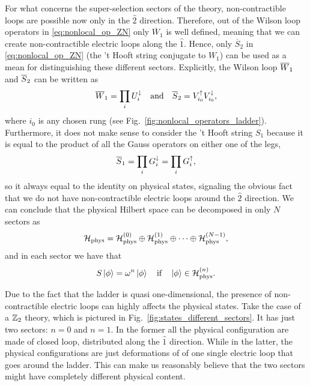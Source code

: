 For what concerns the super-selection sectors of the theory,
non-contractible loops are possible now only in the $\hat{2}$ direction.
Therefore, out of the Wilson loop operators in \eqref{eq:nonlocal_op_ZN} only $\overline{W}_1$ is well defined, meaning that we can create non-contractible electric loops along the $\hat{1}$.
Hence, only $\overline{S}_2$ in \eqref{eq:nonlocal_op_ZN} (the 't Hooft string conjugate to $W_1$) can be used as a mean for distinguishing these different sectors.
Explicitly, the Wilson loop $\overline{W}_1$ and $\overline{S}_2$ can be written as
\begin{equation}
    \Wilson_1 = \prod_{i} \Udown_i \qand
    \tHooft_2 = \Vup_{i_0} \Vdown_{i_0},
\end{equation}
where $i_0$ is any chosen rung (see Fig.~\ref{fig:nonlocal_operators_ladder}).
Furthermore, it does not make sense to consider the 't Hooft string $S_1$ because it is equal to the product of all the Gauss operators on either one of the legs,
\begin{equation}
    \overline{S}_1 = \prod_{i} G^{\downarrow}_i = \prod_{i} G^{\uparrow}_i,
\end{equation}
so it always equal to the identity on physical states, signaling the obvious fact that we do not have non-contractible electric loops around the $\hat{2}$ direction.
We can conclude that the physical Hilbert space can be decomposed in only $N$ sectors as
\begin{equation}
    \mathcal{H}_{\text{phys}} = \mathcal{H}_{\text{phys}}^{(0)} \oplus \mathcal{H}_{\text{phys}}^{(1)} \oplus \dots \oplus \mathcal{H}_{\text{phys}}^{(N-1)},
\end{equation}
and in each sector we have that
\begin{equation}
    S \ket{\phi} = \omega^n \ket{\phi} \quad \text{if} \quad \ket{\phi} \in \mathcal{H}_{\text{phys}}^{(n)}.
\end{equation}

\begin{figure}[t]
\end{figure}


Due to the fact that the ladder is quasi one-dimensional, the presence of non-contractible electric loops can highly affects the physical states.
Take the case of a $\mathbb{Z}_2$ theory, which is pictured in Fig.~\ref{fig:states_different_sectors}.
It has just two sectors: $n=0$ and $n=1$.
In the former all the physical configuration are made of closed loop, distributed along the $\hat{1}$ direction.
While in the latter, the physical configurations are just deformations of of one single electric loop that goes around the ladder.
This can make us reasonably believe that the two sectors might have completely different physical content.



